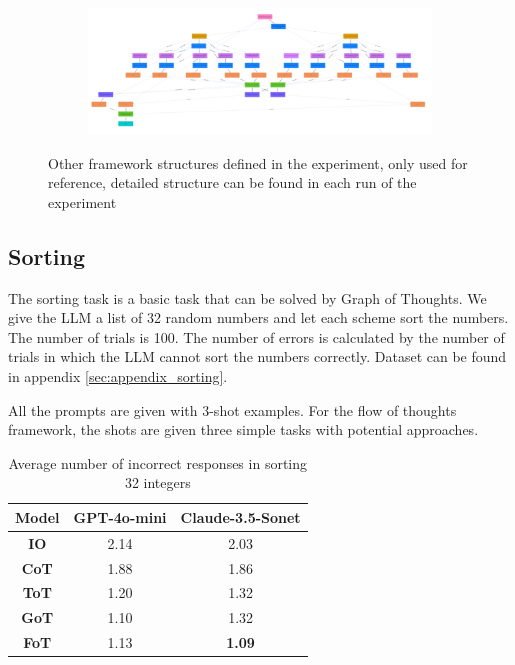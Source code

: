 \documentclass{article}
\begin{document}
\begin{figure}[h]
\begin{subfigure}{0.7\textwidth}
    \end{subfigure}
    \begin{subfigure}{1.0\textwidth}
        \centering
        \includegraphics[width=1.0\textwidth]{images/graph_of_thoughts.png}
    \end{subfigure}
    \caption{Other framework structures defined in the experiment, only used for reference, detailed structure can be found in each run of the experiment}
    \label{fig:sorting_results}
\end{figure}

\subsection{Sorting}

The sorting task is a basic task that can be solved by Graph of Thoughts. We give the LLM a list of 32 random numbers and let each scheme sort the numbers. The number of trials is 100. The number of errors is calculated by the number of trials in which the LLM cannot sort the numbers correctly. Dataset can be found in appendix \ref{sec:appendix_sorting}.

All the prompts are given with 3-shot examples. For the flow of thoughts framework, the shots are given three simple tasks with potential approaches.

\begin{table}[h]
    \centering
    \begin{tabular}{|c|c|c|}
        \hline
        \textbf{Model} & \textbf{GPT-4o-mini} & \textbf{Claude-3.5-Sonet} \\
        \hline \hline
        \textbf{IO}    & 2.14                 & 2.03                     \\
        \textbf{CoT}   & 1.88                 & 1.86                     \\
        \textbf{ToT}   & 1.20                 & 1.32                     \\
        \textbf{GoT}   & 1.10                 & 1.32                     \\
        \textbf{FoT}   & 1.13                 & \textbf{1.09}                     \\
        \hline
    \end{tabular}
    \vspace{1em}
    \caption{Average number of incorrect responses in sorting 32 integers}
    \label{tab:sorting_results}
\end{table}
\end{document}
